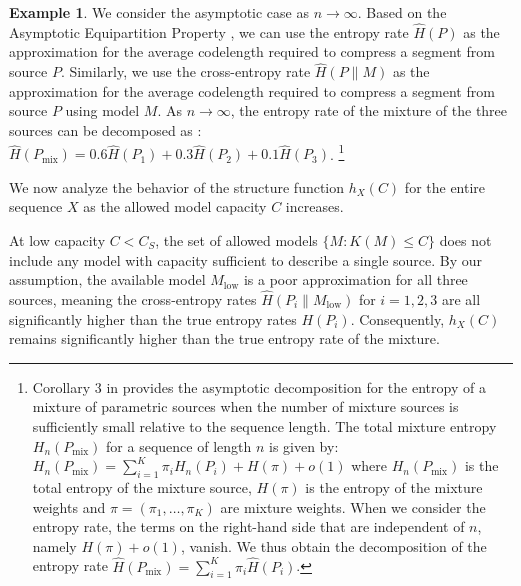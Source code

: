 \documentclass[11pt]{article}
\theoremstyle{plain}
\theoremstyle{definition}
\newtheorem{example}[theorem]{Example}
\newcommand{\entropyrate}{\hat{H}}
\begin{document}
\begin{example}
We consider the asymptotic case as $n\rightarrow \infty$. Based on the Asymptotic Equipartition Property \citep{cover2006elements}, we can use the entropy rate $\entropyrate(P)$ as the approximation for the average codelength required to compress a segment from source $P$. Similarly, we use the cross-entropy rate $\entropyrate(P\| M)$ as the approximation for the average codelength required to compress a segment from source $P$ using model $M$. 
As $n\rightarrow \infty$, the entropy rate of the mixture of the three sources can be decomposed as\citep{beirami2014universal}
: $\entropyrate(P_{\text{mix}})= 0.6\entropyrate(P_1)+0.3\entropyrate(P_2)+0.1\entropyrate(P_3)$.
\footnote{Corollary 3 in \citep{beirami2014universal} provides the asymptotic decomposition for the entropy of a mixture of parametric sources when the number of mixture sources is sufficiently small relative to the sequence length. The total mixture entropy $H_n(P_{\text{mix}})$ for a sequence of length $n$ is given by:$ H_n(P_{\text{mix}}) = \sum_{i=1}^K \pi_i H_n(P_i) + H(\pi) + o(1) $
where $H_n(P_{\text{mix}})$ is the total entropy of the mixture source, $H(\pi)$ is the entropy of the mixture weights and $\pi = (\pi_1, \dots, \pi_K)$ are mixture weights. When we consider the entropy rate, the terms on the right-hand side that are independent of $n$, namely $H(\pi) + o(1)$, vanish. We thus obtain the decomposition of the entropy rate $ \entropyrate(P_{\text{mix}}) = \sum_{i=1}^K \pi_i \entropyrate(P_i) $.}



We now analyze the behavior of the structure function \(h_X(C)\) for the entire sequence \(X\) as the allowed model capacity \(C\) increases.


At low capacity \(C < C_S\), the set of allowed models $\{M: K(M) \le C\}$ does not include any model with capacity sufficient to describe a single source. By our assumption, the available model $M_{\text{low}}$ is a poor approximation for all three sources, meaning the cross-entropy rates $\entropyrate(P_i\|M_{\text{low}})$ for $i=1,2,3$ are all significantly higher than the true entropy rates $H(P_i)$. Consequently,  $h_X(C)$ remains significantly higher than the true entropy rate of the mixture.


\end{example}
\end{document}
